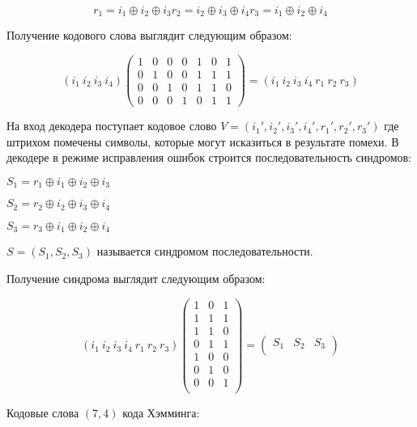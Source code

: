 \begin{equation}
r_1 = i_1 \oplus i_2 \oplus i_3
r_2 = i_2 \oplus i_3 \oplus i_4
r_3 = i_1 \oplus i_2 \oplus i_4
\end{equation}

Получение кодового слова выглядит следующим образом:

\begin{equation}
( i_1 \> i_2 \> i_3 \> i_4 )  \begin{pmatrix}
1 & 0 & 0 & 0 & 1 & 0 & 1 \\
0 & 1 & 0 & 0 & 1 & 1 & 1 \\         
0 & 0 & 1 & 0 & 1 & 1 & 0 \\
0 & 0 & 0 & 1 & 0 & 1 & 1
\end{pmatrix} = ( i_1 \> i_2 \> i_3 \> i_4  \> r_1  \> r_2  \> r_3)
\end{equation}

На вход декодера поступает кодовое слово $V = (i_{1}', i_{2}', i_{3}', i_{4}', r_{1}', r_{2}', r_{3}')$  где штрихом помечены символы, которые могут исказиться в результате помехи. В декодере в режиме исправления ошибок строится последовательность синдромов:

$S_{1}=r_{1}\oplus i_{1}\oplus i_{2}\oplus i_{3}$

$S_{2}=r_{2}\oplus i_{2}\oplus i_{3}\oplus i_{4}$

$S_{3}=r_{3}\oplus i_{1}\oplus i_{2}\oplus i_{4}$

$S=(S_{1},S_{2},S_{3})$ называется синдромом последовательности.

Получение синдрома выглядит следующим образом:

\begin{equation}
(i_{1} \> i_{2} \> i_{3} \> i_{4} \> r_{1} \> r_{2} \> r_{3} )  \begin{pmatrix}
1 & 0 & 1 \\
1 & 1 & 1 \\
1 & 1 & 0 \\
0 & 1 & 1 \\
1 & 0 & 0 \\
0 & 1 & 0 \\
0 & 0 & 1 \\ 
\end{pmatrix} = \begin{pmatrix}S_{1}&S_{2}&S_{3}\\\end{pmatrix}
\end{equation}

Кодовые слова $(7,4)$ кода Хэмминга:

